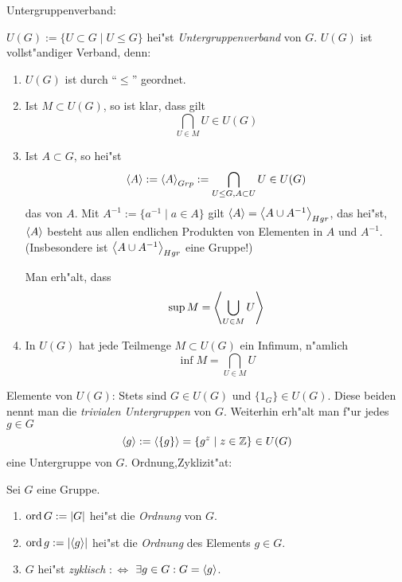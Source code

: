  Untergruppenverband:{
  $U(G):=\{U\subset G\mid U\leq G\}$ hei"st \emph{Untergruppenverband} von $G$. $U(G)$ ist
  vollst"andiger Verband, denn:
  \begin{enumerate}
    \item $U(G)$ ist durch ``$\leq$'' geordnet.
    \item Ist $M\subset U(G)$, so ist klar, dass gilt
      \[\bigcap_{U\in M} U \in U(G)
        \]
    \item 
      Ist $A\subset G$, so hei"st
      \[{\left\langle A\right\rangle}:={\left\langle A\right\rangle}_{Grp}:=\bigcap_{U\leq G,A\subset U} U\in U(G)
        \]
      das \emph{}
      von $A$. Mit $A^{-1}:=\{a^{-1}\mid a\in A\}$ gilt ${\left\langle A\right\rangle}={\left\langle A\cup A^{-1}\right\rangle}_{Hgr}$,
      das hei"st, ${\left\langle A\right\rangle}$ besteht aus allen endlichen Produkten von
      Elementen in $A$ und $A^{-1}$. (Insbesondere ist ${\left\langle A\cup A^{-1}\right\rangle}_{Hgr}$
      eine Gruppe!)
      
      Man erh"alt, dass 
      \[\sup M={\left\langle\bigcup_{U\in M} U\right\rangle}
        \]
    \item In $U(G)$ hat jede Teilmenge $M\subset U(G)$ ein Infimum, n"amlich
      \[\inf M=\bigcap_{U\in M} U
        \]
    \end{enumerate}
  }
\example Elemente von $U(G)$:{
  Stets sind $G\in U(G)$ und $\{1_G\}\in U(G)$. Diese beiden nennt man die
  \emph{trivialen Untergruppen} von $G$. Weiterhin erh"alt man f"ur jedes
  $g\in G$
  \[{\left\langle g\right\rangle}:={\left\langle\{g\}\right\rangle}=\{g^z\mid z\in\mathbb Z\}\in U(G)
    \]
  eine Untergruppe von $G$.
  }
 Ordnung,Zyklizit"at:{
  Sei $G$ eine Gruppe.
  \begin{enumerate}
    \item $\operatorname{ord} G:=|G|$ hei"st die \emph{Ordnung} von $G$.
    \item $\operatorname{ord} g:=|{\left\langle g\right\rangle}|$ hei"st die \emph{Ordnung} des Elements
      $g\in G$.
    \item $G$ hei"st \emph{zyklisch} $:\iff$ $\exists g\in G:G={\left\langle g\right\rangle}$.
    \end{enumerate}
  }

